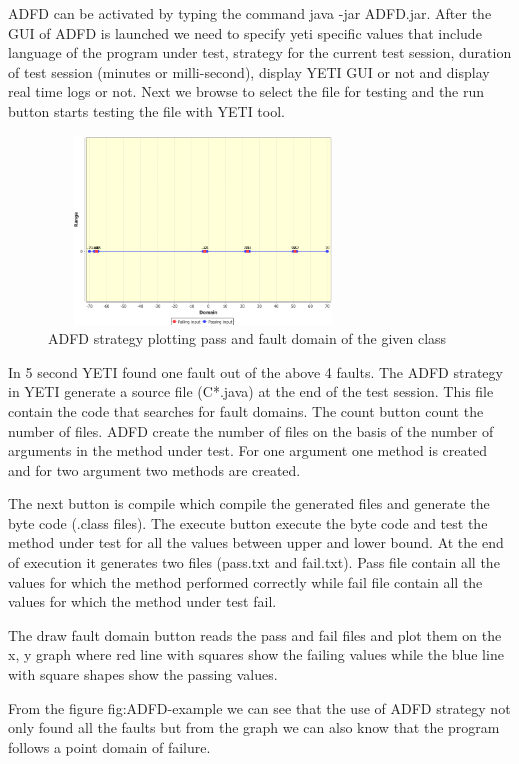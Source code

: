 \documentclass[runningheads,a4paper]{llncs}
\begin{document}
ADFD can be activated by typing the command java -jar ADFD.jar. After the GUI of ADFD is launched we need to specify yeti specific values that include language of the program under test, strategy for the current test session, duration of test session (minutes or milli-second), display YETI GUI or not and display real time logs or not. Next we browse to select the file for testing and the run button starts testing the file with YETI tool. 

\begin{figure}[ht]
\centering
\includegraphics[width=8.2cm,height=5cm]{pointDomainOneArgument.png}
\caption{ADFD strategy plotting pass and fault domain of the given class}
\label{fig:ADFD-example}
\end{figure}


In 5 second YETI found one fault out of the above 4 faults. The ADFD strategy in YETI generate a source file (C*.java) at the end of the test session. This file contain the code that searches for fault domains. The count button count the number of files. ADFD create the number of files on the basis of the number of arguments in the method under test. For one argument one method is created and for two argument two methods are created. 

The next button is compile which compile the generated files and generate the byte code (.class files). The execute button execute the byte code and test the method under test for all the values between upper and lower bound. At the end of execution it generates two files (pass.txt and fail.txt). Pass file contain all the values for which the method performed correctly while fail file contain all the values for which the method under test fail.

The draw fault domain button reads the pass and fail files and plot them on the x, y graph where red line with squares show the failing values while the blue line with square shapes show the passing values.

From the figure {fig:ADFD-example} we can see that the use of ADFD strategy not only found all the faults but from the graph we can also know that the program follows a point domain of failure.
\end{document}
